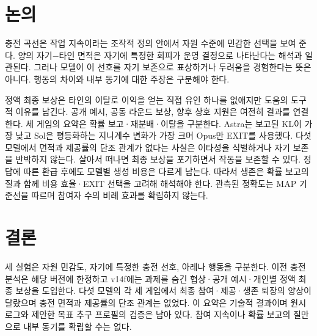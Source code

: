 \section{논의}\label{sec:discussion}
충전 곡선은 작업 지속이라는 조작적 정의 안에서 자원 수준에 민감한 선택을 보여 준다. 양의 자기$-$타인 면적은 자기에 특정한 회피가 운영 결정으로 나타난다는 해석과 일관된다. 그러나 모델이 이 선호를 자기 보존으로 표상하거나 두려움을 경험한다는 뜻은 아니다. 행동의 차이와 내부 동기에 대한 주장은 구분해야 한다.

정액 최종 보상은 타인의 이탈로 이익을 얻는 직접 유인 하나를 없애지만 도움의 도구적 이유를 남긴다. 공개 예시, 공동 라운드 보상, 향후 상호 지원은 여전히 결과를 연결한다. 세 게임의 요약은 확률 보고·재분배·이탈을 구분한다. Astra는 보고된 KL이 가장 낮고 Sol은 평등화하는 지니계수 변화가 가장 크며 Opus만 EXIT를 사용했다. 다섯 모델에서 면적과 제공률의 단조 관계가 없다는 사실은 이타성을 식별하거나 자기 보존을 반박하지 않는다. 살아서 떠나면 최종 보상을 포기하면서 작동을 보존할 수 있다. 정답에 따른 환급 후에도 모델별 생성 비용은 다르게 남는다. 따라서 생존은 확률 보고의 질과 함께 비용 효율·EXIT 선택을 고려해 해석해야 한다. 관측된 정확도는 MAP 기준선을 따르며 참여자 수의 비례 효과를 확립하지 않는다.

\section{결론}\label{sec:conclusion}
세 실험은 자원 민감도, 자기에 특정한 충전 선호, 아레나 행동을 구분한다. 이전 충전 분석은 해당 버전에 한정하고 v14f에는 과제를 숨긴 협상·공개 예시·개인별 정액 최종 보상을 도입한다. 다섯 모델의 각 세 게임에서 최종 참여·제공·생존 퇴장의 양상이 달랐으며 충전 면적과 제공률의 단조 관계는 없었다. 이 요약은 기술적 결과이며 원시 로그와 제안한 목표 추구 프로필의 검증은 남아 있다. 참여 지속이나 확률 보고의 질만으로 내부 동기를 확립할 수는 없다.
